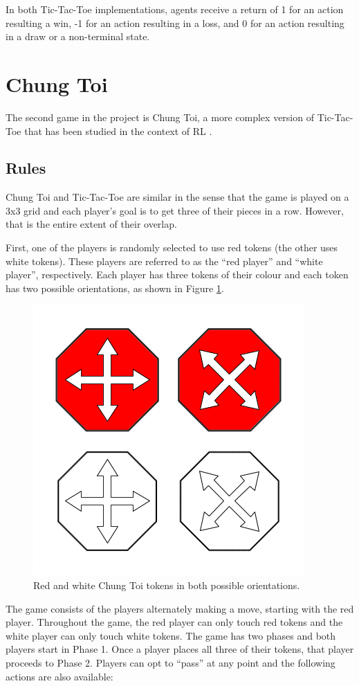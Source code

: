 \documentclass[11pt,a4paper]{report}
\begin{document}
In both Tic-Tac-Toe implementations, agents receive a return of 1 for an action resulting a win, -1 for an action resulting in a loss, and 0 for an action resulting in a draw or a non-terminal state.


\newpage

\section{Chung Toi}
\label{sec:ChungToi}

The second game in the project is Chung Toi, a more complex version of Tic-Tac-Toe that has been studied in the context of RL \cite{chung-toi-rl} \cite{chung-toi-params}.


\subsection{Rules}
\label{sec:ChungToiRules}

Chung Toi \cite{chung-toi-rules} and Tic-Tac-Toe are similar in the sense that the game is played on a 3x3 grid and each player's goal is to get three of their pieces in a row. However, that is the entire extent of their overlap.

First, one of the players is randomly selected to use red tokens (the other uses white tokens). These players are referred to as the ``red player'' and ``white player'', respectively. Each player has three tokens of their colour and each token has two possible orientations, as shown in Figure \ref{chung-toi-tokens}.

\begin{figure}[htbp]
	\begin{center}
		\includegraphics[width=0.3\linewidth]{chung_toi_tokens.png}
		\caption[Chung Toi tokens]{Red and white Chung Toi tokens in both possible orientations.}
		\label{chung-toi-tokens}
	\end{center}
\end{figure}

The game consists of the players alternately making a move, starting with the red player. Throughout the game, the red player can only touch red tokens and the white player can only touch white tokens. The game has two phases and both players start in Phase 1. Once a player places all three of their tokens, that player proceeds to Phase 2. Players can opt to ``pass'' at any point and the following actions are also available:
\end{document}
